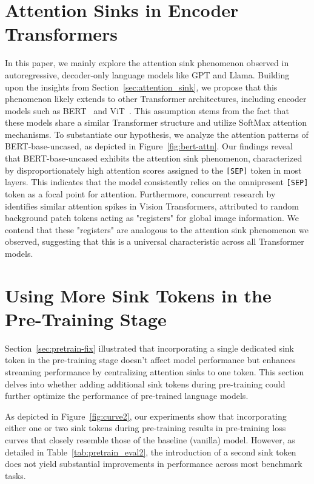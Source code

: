 \section{Attention Sinks in Encoder Transformers}
\label{sec:bert_attn}

In this paper, we mainly explore the attention sink phenomenon observed in autoregressive, decoder-only language models like GPT and Llama. Building upon the insights from Section~\ref{sec:attention_sink}, we propose that this phenomenon likely extends to other Transformer architectures, including encoder models such as BERT~\citep{Devlin2019BERTPO} and ViT~\citep{dosovitskiy2021image}. This assumption stems from the fact that these models share a similar Transformer structure and utilize SoftMax attention mechanisms. To substantiate our hypothesis, we analyze the attention patterns of BERT-base-uncased, as depicted in Figure~\ref{fig:bert-attn}. Our findings reveal that BERT-base-uncased exhibits the attention sink phenomenon, characterized by disproportionately high attention scores assigned to the \texttt{[SEP]} token in most layers. This indicates that the model consistently relies on the omnipresent \texttt{[SEP]} token as a focal point for attention. Furthermore, concurrent research by~\citeauthor{Darcet2023Registers} identifies similar attention spikes in Vision Transformers, attributed to random background patch tokens acting as "registers" for global image information. We contend that these "registers" are analogous to the attention sink phenomenon we observed, suggesting that this is a universal characteristic across all Transformer models.

\section{Using More Sink Tokens in the Pre-Training Stage}
Section~\ref{sec:pretrain-fix} illustrated that incorporating a single dedicated sink token in the pre-training stage doesn't affect model performance but enhances streaming performance by centralizing attention sinks to one token. This section delves into whether adding additional sink tokens during pre-training could further optimize the performance of pre-trained language models.

As depicted in Figure~\ref{fig:curve2}, our experiments show that incorporating either one or two sink tokens during pre-training results in pre-training loss curves that closely resemble those of the baseline (vanilla) model. However, as detailed in Table~\ref{tab:pretrain_eval2}, the introduction of a second sink token does not yield substantial improvements in performance across most benchmark tasks.

